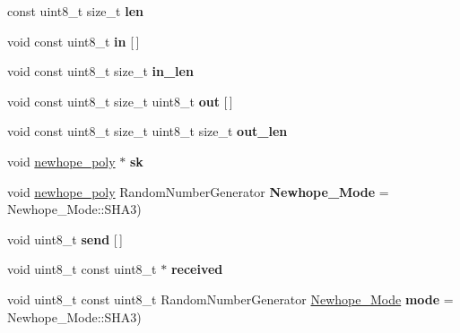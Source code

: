 \begin{DoxyCompactItemize}
\mbox{\label{namespace_botan_ae7f3272205661a4f6ceb8ea6d28f9fc7}} 
const uint8\+\_\+t size\+\_\+t {\bfseries len}
\item 
\mbox{\label{namespace_botan_a3c07094e2de5695d894811e6778b30d4}} 
void const uint8\+\_\+t {\bfseries in} \mbox{[}$\,$\mbox{]}
\item 
\mbox{\label{namespace_botan_a439e1214de59cd31af33a125a39e0646}} 
void const uint8\+\_\+t size\+\_\+t {\bfseries in\+\_\+len}
\item 
\mbox{\label{namespace_botan_a17f84a730c51d72e66dc32faf1a99aa4}} 
void const uint8\+\_\+t size\+\_\+t uint8\+\_\+t {\bfseries out} \mbox{[}$\,$\mbox{]}
\item 
\mbox{\label{namespace_botan_a9fe91df64b81936f8664fe771e3d5b8c}} 
void const uint8\+\_\+t size\+\_\+t uint8\+\_\+t size\+\_\+t {\bfseries out\+\_\+len}
\item 
\mbox{\label{namespace_botan_a096197074416af0f41dd9b5777dae7b2}} 
void \hyperlink{class_botan_1_1newhope__poly}{newhope\+\_\+poly} $\ast$ {\bfseries sk}
\item 
\mbox{\label{namespace_botan_ae0392b66238af293103acadaa30ad8c3}} 
void \hyperlink{class_botan_1_1newhope__poly}{newhope\+\_\+poly} Random\+Number\+Generator {\bfseries Newhope\+\_\+\+Mode} = Newhope\+\_\+\+Mode\+::\+S\+H\+A3)
\item 
\mbox{\label{namespace_botan_aac40319b7635443904dad2c1c2e57a38}} 
void uint8\+\_\+t {\bfseries send} \mbox{[}$\,$\mbox{]}
\item 
\mbox{\label{namespace_botan_ae5584f0f17d61e6271665a464d77fdb3}} 
void uint8\+\_\+t const uint8\+\_\+t $\ast$ {\bfseries received}
\item 
\mbox{\label{namespace_botan_a82acec4ee142a4756ebe9a6dd6a64d41}} 
void uint8\+\_\+t const uint8\+\_\+t Random\+Number\+Generator \hyperlink{namespace_botan_a42a70d7cfb95e4f7773d3b52dc98ad61}{Newhope\+\_\+\+Mode} {\bfseries mode} = Newhope\+\_\+\+Mode\+::\+S\+H\+A3)

\end{DoxyCompactItemize}
